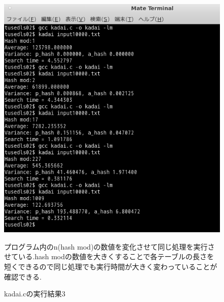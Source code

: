 \documentclass{jsarticle}
\begin{document}
\begin{figure}[!htbp]
\begin{center}
\includegraphics[width=150mm]{3.png}
\caption{kadai.cの実行結果3}
\end{center}
プログラム内のn(hash mod)の数値を変化させて同じ処理を実行させている.hash modの数値を大きくすることで各テーブルの長さを短くできるので同じ処理でも実行時間が大きく変わっていることが確認できる.
\end{figure}
\newpage
\end{document}
